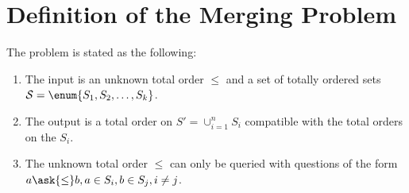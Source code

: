 \section{Definition of the Merging Problem}
\label{tree:merging:def}

The problem is stated as the following:

\begin{enumerate}
\item The input is an unknown total order $\le$ and a set of totally ordered
sets ${\cal S} = \enum{S_1, S_2, \ldots, S_k}$.
\item The output is a total order on $S' = \cup_{i=1}^{n} S_i$ compatible with
the total orders on the $S_i$.
\item The unknown total order $\le$ can only be queried with questions of the
form $a \ask{\le} b, a \in S_i, b \in S_j, i \neq j$.
\end{enumerate}

